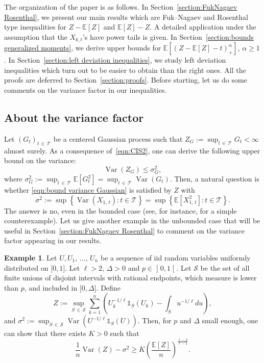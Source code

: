 \documentclass[10pt]{amsart}
\theoremstyle{definition}\newtheorem{defi}[theo]{Definition}\newtheorem{rema}[theo]{Remark}\newtheorem{exam}[theo]{Example}\newtheorem{exem}[theo]{Example}\newtheorem{nota}[theo]{Notation}
\DeclareMathOperator{\Var}{Var}
\newcommand{\bE}{\mathbb{E}}
\newcommand{\cS}{\mathcal{S}}
\newcommand{\cT}{\mathcal{T}}
\newcommand{\intervalleoo}[2]{\mathopen{]} #1\mathclose{}\mathpunct{},#2\mathclose{[}}
\newcommand{\intervalleff}[2]{\mathopen{[} #1\mathclose{}\mathpunct{},#2\mathclose{]}}
\newcommand{\ind}{\mathds{1}}
\begin{document}
The organization of the paper is as follows. In Section~\ref{section:FukNagaev Rosenthal}, we present our main results which are Fuk--Nagaev and Rosenthal type inequalities for $Z-\bE[Z]$ and $\bE[Z]-Z$. A detailed application under the assumption that the $X_{k,t}$'s have power tails is given. In Section~\ref{section:bounds generalized moments}, we derive upper bounds for $\bE[(Z-\bE[Z]-t)_+^\alpha]$, $\alpha\geq 1$. In Section~\ref{section:left deviation inequalities}, we study left deviation inequalities which turn out to be easier to obtain than the right ones. All the proofs are deferred to Section~\ref{section:proofs}. Before starting, let us do some comments on the variance factor in our inequalities.

\subsection{About the variance factor}\label{sect1.3}
Let $(G_t)_{t\,\in\,\cT}$ be a centered Gaussian process such that $Z_G:=\sup_{t\,\in\,\cT}G_t<\infty$ almost surely. As a consequence of~\eqref{eqn:CIS2}, one can derive the following upper bound on the variance:
\begin{equation}\label{eqn:bound variance Gaussian}
\Var(Z_G)\leq \sigma_G^2,
\end{equation}
where $\sigma_G^2:=\sup_{t\,\in\,\cT}\bE[G_t^2]=\sup_{t\,\in\,\cT}\Var(G_t)$. Then, a natural question is whether \eqref{eqn:bound variance Gaussian} is satisfied by $Z$ with
\begin{equation}\label{eqn:def wimpy}
\sigma^2:=\sup\left\{\Var(X_{1,\,t}):t\in\cT\right\}=\sup\left\{\bE\left[X_{1,\,t}^2\right] : t\in\cT\right\}.
\end{equation}
The answer is no, even in the bounded case (see, for instance, \cite[Exercise~11.1]{BLM13} for a simple counterexample). Let us give another example in the unbounded case that will be useful in Section~\ref{section:FukNagaev Rosenthal} to comment on the variance factor appearing in our results.

\begin{exam}\label{example:power type tail}
Let $U,U_1,\,\ldots,\,U_n$ be a sequence of iid random variables uniformly distributed on $\intervalleff 01$. Let $\ell>2$, $\Delta>0$ and $p\in\intervalleoo 01$. Let $\cS$ be the set of all finite unions of disjoint intervals with rational endpoints, which measure is lower than $p$, and included in $\intervalleff{0}{\Delta}$. Define
\[
Z:=\sup_{S\,\in\,\cS}\sum_{k=1}^n \left(U_k^{-1/\ell}\ind_S(U_k)-\int_S u^{-1/\ell}du\right),
\]
and $\sigma^2:=\sup_{S\,\in\,\cS}\Var(U^{-1/\ell}\ind_{S}(U))$. Then, for $p$ and $\Delta$ small enough, one can show that there exists $K>0$ such that
\begin{equation}\label{eqn:example lower bound VarZ}
\frac 1n\Var(Z)-\sigma^2\geq K\left(\frac{\bE[Z]}{n}\right)^{\frac{\ell-2}{\ell-1}}.
\end{equation}
\end{exam}
\end{document}
